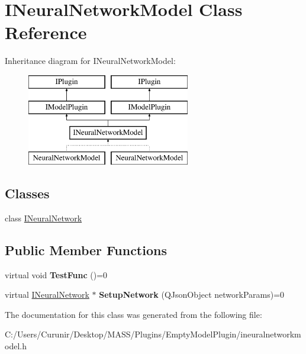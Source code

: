 \hypertarget{class_i_neural_network_model}{}\section{I\+Neural\+Network\+Model Class Reference}
\label{class_i_neural_network_model}
Inheritance diagram for I\+Neural\+Network\+Model\+:\begin{figure}[H]
\begin{center}
\leavevmode
\includegraphics[height=4.000000cm]{class_i_neural_network_model}
\end{center}
\end{figure}
\subsection*{Classes}
\begin{DoxyCompactItemize}
\item 
class \hyperlink{class_i_neural_network_model_1_1_i_neural_network}{I\+Neural\+Network}
\end{DoxyCompactItemize}
\subsection*{Public Member Functions}
\begin{DoxyCompactItemize}
\item 
\mbox{\label{class_i_neural_network_model_ac81fd0c1ff87a9147351f1d384a1692e}} 
virtual void {\bfseries Test\+Func} ()=0
\item 
\mbox{\label{class_i_neural_network_model_a4732c112899b5f3a4d81db89c7d389a4}} 
virtual \hyperlink{class_i_neural_network_model_1_1_i_neural_network}{I\+Neural\+Network} $\ast$ {\bfseries Setup\+Network} (Q\+Json\+Object network\+Params)=0
\end{DoxyCompactItemize}


The documentation for this class was generated from the following file\+:\begin{DoxyCompactItemize}
\item 
C\+:/\+Users/\+Curunir/\+Desktop/\+M\+A\+S\+S/\+Plugins/\+Empty\+Model\+Plugin/ineuralnetworkmodel.\+h\end{DoxyCompactItemize}
